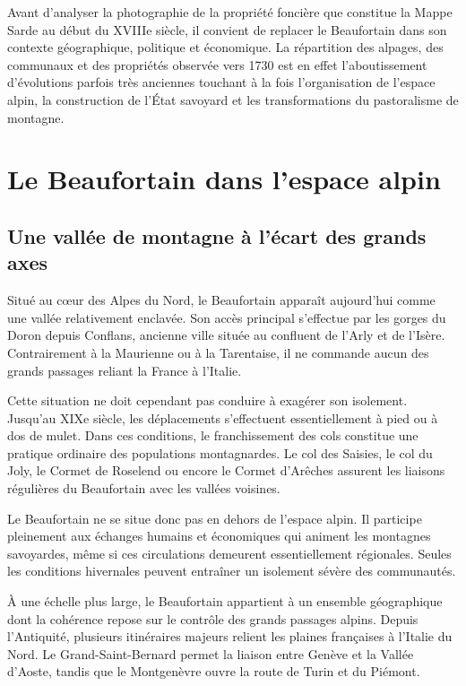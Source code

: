\documentclass[12pt,a4paper]{report}
\begin{document}
Avant d'analyser la photographie de la propriété foncière que constitue la Mappe Sarde au début du XVIIIe siècle, il convient de replacer le Beaufortain dans son contexte géographique, politique et économique. La répartition des alpages, des communaux et des propriétés observée vers 1730 est en effet l'aboutissement d'évolutions parfois très anciennes touchant à la fois l'organisation de l'espace alpin, la construction de l'État savoyard et les transformations du pastoralisme de montagne.

\section{Le Beaufortain dans l'espace alpin}

\subsection{Une vallée de montagne à l'écart des grands axes}

Situé au cœur des Alpes du Nord, le Beaufortain apparaît aujourd'hui comme une vallée relativement enclavée. Son accès principal s'effectue par les gorges du Doron depuis Conflans, ancienne ville située au confluent de l'Arly et de l'Isère. Contrairement à la Maurienne ou à la Tarentaise, il ne commande aucun des grands passages reliant la France à l'Italie.

Cette situation ne doit cependant pas conduire à exagérer son isolement. Jusqu'au XIXe siècle, les déplacements s'effectuent essentiellement à pied ou à dos de mulet. Dans ces conditions, le franchissement des cols constitue une pratique ordinaire des populations montagnardes. Le col des Saisies, le col du Joly, le Cormet de Roselend ou encore le Cormet d'Arêches assurent les liaisons régulières du Beaufortain avec les vallées voisines.



Le Beaufortain ne se situe donc pas en dehors de l'espace alpin. Il participe pleinement aux échanges humains et économiques qui animent les montagnes savoyardes, même si ces circulations demeurent essentiellement régionales. Seules les conditions hivernales peuvent entraîner un isolement sévère des communautés.

À une échelle plus large, le Beaufortain appartient à un ensemble géographique dont la cohérence repose sur le contrôle des grands passages alpins. Depuis l'Antiquité, plusieurs itinéraires majeurs relient les plaines françaises à l'Italie du Nord. Le Grand-Saint-Bernard permet la liaison entre Genève et la Vallée d'Aoste, tandis que le Montgenèvre ouvre la route de Turin et du Piémont.
\end{document}
